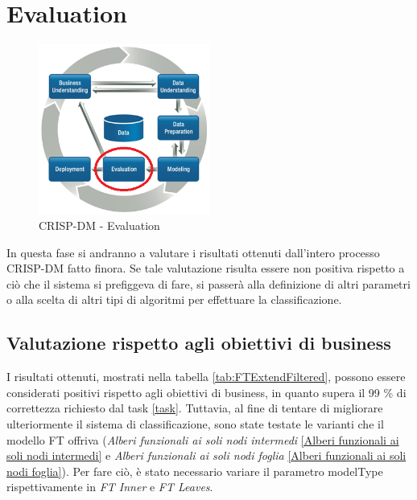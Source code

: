 \chapter{Evaluation}

\begin{figure}[hbtp]
	\centering
	\includegraphics[width=0.5\textwidth]{./images/CRISPDM_5.png}
	\caption{CRISP-DM - Evaluation}
	\label{CRISPDM_5}
\end{figure}
In questa fase si andranno a valutare i risultati ottenuti dall'intero processo CRISP-DM fatto finora. Se tale valutazione risulta essere non positiva rispetto a ciò che il sistema si prefiggeva di fare, si passerà alla definizione di altri parametri o alla scelta di altri tipi di algoritmi per effettuare la classificazione.

\section{Valutazione rispetto agli obiettivi di business}
I risultati ottenuti, mostrati nella tabella \ref{tab:FTExtendFiltered}, possono essere considerati positivi rispetto agli obiettivi di business, in quanto supera il 99 \% di correttezza richiesto dal task \ref{task}. 
Tuttavia, al fine di tentare di migliorare ulteriormente il sistema di classificazione, sono state testate le varianti che il modello FT offriva (\emph{Alberi funzionali ai soli nodi intermedi} \ref{Alberi funzionali ai soli nodi intermedi} e \emph{Alberi funzionali ai soli nodi foglia} \ref{Alberi funzionali ai soli nodi foglia}). Per fare ciò, è stato necessario variare il parametro modelType rispettivamente in \emph{FT Inner} e \emph{FT Leaves}.


